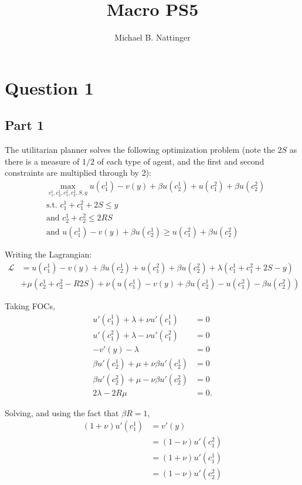 \documentclass[11pt]{article} %
\title{Macro PS5}
\author{Michael B. Nattinger}
\begin{document}
\maketitle
\section{Question 1}
\subsection{Part 1}
The utilitarian planner solves the following optimization problem (note the $2S$ as there is a measure of $1/2$ of each type of agent, and the first and second constraints are multiplied through by 2):
\begin{align*}
&\max_{c_1^1,c_2^1,c_1^2,c_2^2,S,y} u(c_1^1) - v(y) + \beta u(c_2^1)+u(c_1^2) + \beta u(c_2^2)\\
&\text{s.t. } c_1^1 + c_1^2 + 2S \leq y\\
&\text{and } c_2^1 + c_2^2 \leq 2RS \\ %
&\text{and } u(c_1^1) - v(y) + \beta u(c_2^1) \geq u(c_1^2) + \beta u(c_2^2)
\end{align*}

Writing the Lagrangian:
\begin{align*}
\mathcal{L} &= u(c_1^1) - v(y) + \beta u(c_2^1) + u(c_1^2) + \beta u(c_2^2) +\lambda (c_1^1 + c_1^2 + 2S - y)  \\ &+ \mu (c_2^1 + c_2^2 - R2S) + \nu (u(c_1^1) - v(y) + \beta u(c_2^1) - u(c_1^2) - \beta u(c_2^2))  
\end{align*}

Taking FOCs,
\begin{align*}
u'(c_1^1) + \lambda + \nu u'(c_1^1)  &= 0\\
u'(c_1^2) + \lambda - \nu u'(c_1^2) &= 0 \\
-v'(y) - \lambda &= 0\\
\beta u'(c_2^1) + \mu + \nu\beta u'(c_2^1) &= 0 \\
\beta u'(c_2^2) + \mu  - \nu\beta u'(c_2^2)&= 0 \\
2\lambda - 2R\mu &= 0.
\end{align*}

Solving, and using the fact that $\beta R = 1$,
\begin{align*}
(1+\nu)u'(c_1^1) &= v'(y)\\
&= (1-\nu)u'(c_1^2)\\
&= (1+\nu)u'(c_1^1) \\
&= (1-\nu)u'(c_2^2)
\end{align*}
\end{document}
